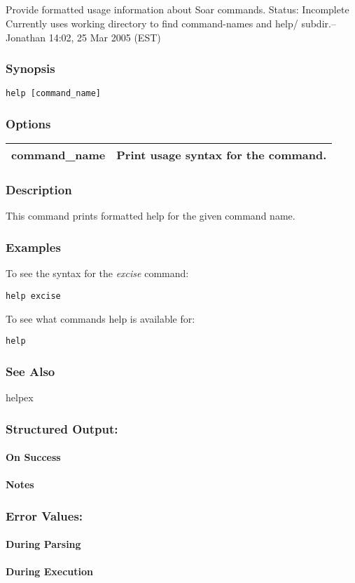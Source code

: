 \subsection{}
\label{help}
Provide formatted usage information about Soar commands. 
 Status: Incomplete\\ 
Currently uses working directory to find command-names and help/ subdir.--Jonathan 14:02, 25 Mar 2005 (EST) 
\subsubsection*{Synopsis}
\begin{verbatim}
help [command_name]
\end{verbatim}
\subsubsection*{Options}
\begin{tabular}{|l|l|}
\hline 
 command\_name  & Print usage syntax for the command.  \\
 \hline 
\end{tabular}
\subsubsection*{Description}
 This command prints formatted help for the given command name. 
\subsubsection*{Examples}
 To see the syntax for the \emph{excise}
 command: \begin{verbatim}
help excise
\end{verbatim}
 To see what commands help is available for: \begin{verbatim}
help
\end{verbatim}
\subsubsection*{See Also}
 helpex
\subsubsection*{Structured Output:}
\paragraph*{On Success}
\paragraph*{Notes}
\subsubsection*{Error Values:}
\paragraph*{During Parsing}
\paragraph*{During Execution}
